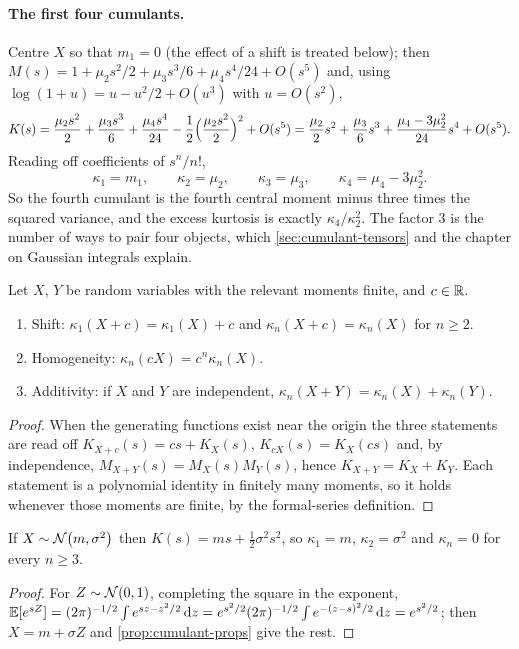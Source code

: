 \paragraph{The first four cumulants.}
Centre $X$ so that $m_1=0$ (the effect of a shift is treated below); then
$M(s)=1+\mu_2s^2/2+\mu_3s^3/6+\mu_4s^4/24+O(s^5)$ and, using
$\log(1+u)=u-u^2/2+O(u^3)$ with $u=O(s^2)$,
\begin{equation}
  K(s)=\frac{\mu_2s^2}{2}+\frac{\mu_3s^3}{6}+\frac{\mu_4s^4}{24}
      -\frac12\Bigl(\frac{\mu_2s^2}{2}\Bigr)^2+O(s^5)
      =\frac{\mu_2}{2}s^2+\frac{\mu_3}{6}s^3+\frac{\mu_4-3\mu_2^2}{24}s^4+O(s^5).
\end{equation}
Reading off coefficients of $s^n/n!$,
\begin{equation}
  \kappa_1=m_1,\qquad \kappa_2=\mu_2,\qquad \kappa_3=\mu_3,\qquad \kappa_4=\mu_4-3\mu_2^2.
  \label{eq:kappa1234}
\end{equation}
So the fourth cumulant is the fourth central moment minus three times the squared
variance, and the excess kurtosis is exactly $\kappa_4/\kappa_2^2$. The factor $3$ is
the number of ways to pair four objects, which \cref{sec:cumulant-tensors} and the
chapter on Gaussian integrals explain.

\begin{proposition}
\label{prop:cumulant-props}
Let $X$, $Y$ be random variables with the relevant moments finite, and $c\in\mathbb{R}$.
\begin{enumerate}[label=(\roman*)]
\item Shift: $\kappa_1(X+c)=\kappa_1(X)+c$ and $\kappa_n(X+c)=\kappa_n(X)$ for $n\ge2$.
\item Homogeneity: $\kappa_n(cX)=c^n\kappa_n(X)$.
\item Additivity: if $X$ and $Y$ are independent, $\kappa_n(X+Y)=\kappa_n(X)+\kappa_n(Y)$.
\end{enumerate}
\end{proposition}
\begin{proof}
When the generating functions exist near the origin the three statements are read
off $K_{X+c}(s)=cs+K_X(s)$, $K_{cX}(s)=K_X(cs)$ and, by independence,
$M_{X+Y}(s)=M_X(s)M_Y(s)$, hence $K_{X+Y}=K_X+K_Y$. Each statement is a polynomial
identity in finitely many moments, so it holds whenever those moments are finite,
by the formal-series definition.
\end{proof}

\begin{proposition}
\label{prop:gauss-cumulants}
If $X\sim\mathcal{N}\!\left(m,\sigma^2\right)$ then $K(s)=ms+\tfrac12\sigma^2s^2$, so $\kappa_1=m$,
$\kappa_2=\sigma^2$ and $\kappa_n=0$ for every $n\ge3$.
\end{proposition}
\begin{proof}
For $Z\sim\mathcal{N}\!\left(0,1\right)$, completing the square in the exponent,
$\mathbb{E}[e^{sZ}]=(2\pi)^{-1/2}\int e^{sz-z^2/2}\,\mathrm{d} z=e^{s^2/2}(2\pi)^{-1/2}\int e^{-(z-s)^2/2}\,\mathrm{d} z=e^{s^2/2}$;
then $X=m+\sigma Z$ and \cref{prop:cumulant-props} give the rest.
\end{proof}

